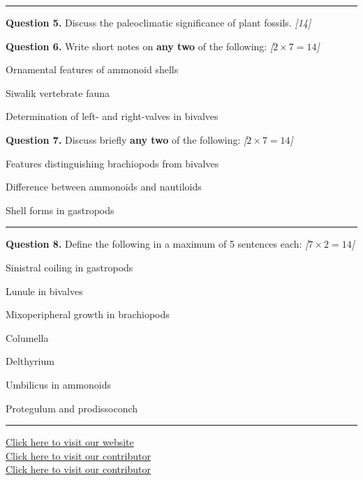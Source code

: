 \documentclass[11pt,a4paper]{article}
\newcommand{\pts}[1]{\hfill   \textit{[#1]}}
\begin{document}
\bigskip


\rule{\linewidth}{0.4pt}\smallskip




\noindent   \textbf{Question 5.} Discuss the paleoclimatic significance of plant fossils. \pts{14}

\medskip


\noindent   \textbf{Question 6.} Write short notes on   \textbf{any two} of the following: \pts{$2  \times 7 = 14$}

\begin{parts}
  \item Ornamental features of ammonoid shells
  \item Siwalik vertebrate fauna
  \item Determination of left- and right-valves in bivalves
\end{parts}

\medskip


\noindent   \textbf{Question 7.} Discuss briefly   \textbf{any two} of the following: \pts{$2  \times 7 = 14$}

\begin{parts}
  \item Features distinguishing brachiopods from bivalves
  \item Difference between ammonoids and nautiloids
  \item Shell forms in gastropods
\end{parts}

\bigskip


\rule{\linewidth}{0.4pt}\smallskip




\noindent   \textbf{Question 8.} Define the following in a maximum of 5 sentences each: \pts{$7  \times 2 = 14$}

\begin{parts}
  \item Sinistral coiling in gastropods
  \item Lunule in bivalves
  \item Mixoperipheral growth in brachiopods
  \item Columella
  \item Delthyrium
  \item Umbilicus in ammonoids
  \item Protegulum and prodissoconch
\end{parts}

\vfill\rule{\linewidth}{0.4pt}

\begin{center}\small
\href{https://bhu-exam.vercel.app/}{Click here to visit our website}\\[4pt]
\href{https://me-aryan.vercel.app/}{Click here to visit our contributor}\\[4pt]
\href{https://quashan-me.vercel.app/}{Click here to visit our contributor}
\end{center}
\end{document}
